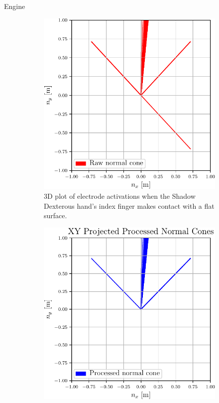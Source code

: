 Engine 

\begin{figure}[h]
	\centering
	\begin{subfigure}[b]{0.48\textwidth}
		\centering
		\includegraphics[width=\textwidth]{chapters/1-tactile-perception/fig/matplotlib/xy-projected-raw-normal-cones.pdf}
		\caption{3D plot of electrode activations when the Shadow Dexterous hand's index finger makes contact with a flat surface.}
		\label{fig:simulated-electrode-distribution3}
	\end{subfigure}
	\hfill
	\begin{subfigure}[b]{0.48\textwidth}
		\centering
		\includegraphics[width=\textwidth]{chapters/1-tactile-perception/fig/matplotlib/xy-projected-processed-normal-cones.pdf}

\end{subfigure}
\end{figure}
